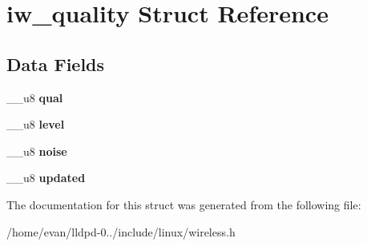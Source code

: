 \section{iw\-\_\-quality \-Struct \-Reference}
\label{structiw__quality}
\subsection*{\-Data \-Fields}
\begin{DoxyCompactItemize}
\item 
\-\_\-\-\_\-u8 {\bfseries qual}\label{structiw__quality_a6a24219059c0b01d132b7672ac955f7f}

\item 
\-\_\-\-\_\-u8 {\bfseries level}\label{structiw__quality_a633705b2b970f6de236012b7fc977364}

\item 
\-\_\-\-\_\-u8 {\bfseries noise}\label{structiw__quality_aaa2cb708953c5653f6b662a1e21bd3e2}

\item 
\-\_\-\-\_\-u8 {\bfseries updated}\label{structiw__quality_a1e09264ce16948c1b4575b1b775ab5f1}

\end{DoxyCompactItemize}


\-The documentation for this struct was generated from the following file\-:\begin{DoxyCompactItemize}
\item 
/home/evan/lldpd-\/0../include/linux/wireless.\-h\end{DoxyCompactItemize}
